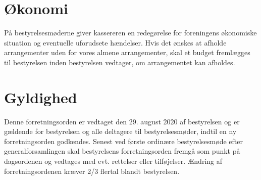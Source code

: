 \section{Økonomi}
På bestyrelsesmøderne giver kassereren en redegørelse for foreningens økonomiske situation og eventuelle uforudsete hændelser. Hvis det ønskes at afholde arrangementer uden for vores almene arrangementer, skal et budget fremlægges til bestyrelsen inden bestyrelsen vedtager, om arrangementet kan afholdes.

\section{Gyldighed}
Denne forretningsorden er vedtaget den 29. august 2020 af bestyrelsen og er gældende for bestyrelsen og alle deltagere til bestyrelsesmøder, indtil en ny forretningsorden godkendes. Senest ved første ordinære bestyrelsesmøde efter generalforsamlingen skal bestyrelsens forretningsorden fremgå som punkt på dagsordenen og vedtages med evt. rettelser eller tilføjelser. Ændring af forretningsordenen kræver 2/3 flertal blandt bestyrelsen.


